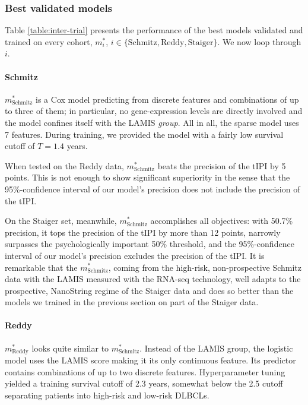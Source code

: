 \subsubsection{Best validated models}

Table \ref{table:inter-trial} presents the performance of the best models validated and trained on 
every cohort, $m_i^*$, $i \in \{ \text{Schmitz}, \text{Reddy}, \text{Staiger} \}$. We now loop 
through $i$.



\paragraph{Schmitz}
$m^*_\text{Schmitz}$ is a Cox model predicting from discrete features and combinations of up to 
three of them; in particular, no gene-expression levels are directly involved and the model confines 
itself with the LAMIS \textit{group}. All in all, the sparse model uses \num{7} features. During 
training, we provided the model with a fairly low survival cutoff of $T = \num{1.4}$ years.

When tested on the Reddy data, $m^*_\text{Schmitz}$ beats the precision of the tIPI by 5 points. This 
is not enough to show significant superiority in the sense that the \num{95}\%-confidence interval 
of our model's precision does not include the precision of the tIPI.

On the Staiger set, meanwhile, $m^*_\text{Schmitz}$ accomplishes all objectives: with 
\num{50.7}\% precision, it tops the precision of the tIPI by more than 12 points, narrowly surpasses the 
psychologically important \num{50}\% threshold, and the \num{95}\%-confidence interval of our model's 
precision excludes the precision of the tIPI. It is remarkable that the $m^*_\text{Schmitz}$, coming from 
the high-risk, non-prospective Schmitz data with the LAMIS measured with the 
RNA-seq technology, well adapts to the prospective, NanoString regime of the Staiger data and 
does so better than the models we trained in the previous section on part of the Staiger data.

\paragraph{Reddy}
$m^*_\text{Reddy}$ looks quite similar to $m^*_\text{Schmitz}$. Instead of the LAMIS group, the 
logistic model uses the LAMIS score making it its only continuous feature. Its predictor contains 
combinations of up to two discrete features. Hyperparameter tuning yielded a training survival 
cutoff of \num{2.3} years, somewhat below the \num{2.5} cutoff separating patients into high-risk 
and low-risk DLBCLs. 

